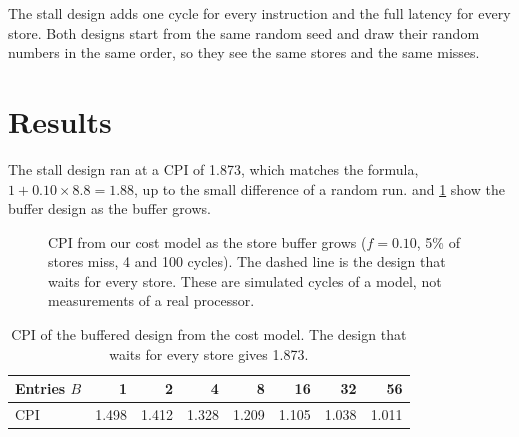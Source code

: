 The stall design adds one cycle for every instruction and the full latency for every store. Both designs start from the same random seed and draw their random numbers in the same order, so they see the same stores and the same misses.

\section{Results}
\label{sec:cpiresults}

The stall design ran at a CPI of 1.873, which matches the formula, $1 + 0.10 \times 8.8 = 1.88$, up to the small difference of a random run.  and \cref{tab:cpi} show the buffer design as the buffer grows.

\begin{figure}[!htbp]
\centering
{}
\caption{CPI from our cost model as the store buffer grows ($f = 0.10$, 5\% of stores miss, 4 and 100 cycles). The dashed line is the design that waits for every store. These are simulated cycles of a model, not measurements of a real processor.}
\label{fig:cpi}
\end{figure}

\begin{table}[!htbp]
\centering\small
\caption{CPI of the buffered design from the cost model. The design that waits for every store gives 1.873.}
\label{tab:cpi}
\begin{tabular}{@{}lrrrrrrr@{}}
\toprule
Entries $B$ & 1 & 2 & 4 & 8 & 16 & 32 & 56\\
\midrule
CPI & 1.498 & 1.412 & 1.328 & 1.209 & 1.105 & 1.038 & 1.011\\
\bottomrule
\end{tabular}
\end{table}


